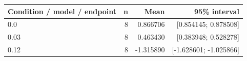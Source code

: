 \begin{longtable}{p{.56\linewidth}rrr}
\toprule Condition / model / endpoint & n & Mean & 95\% interval\\\midrule
0.0 & 8 & 0.866706 & [0.854145; 0.878508] \\
0.03 & 8 & 0.463430 & [0.383948; 0.528278] \\
0.12 & 8 & -1.315890 & [-1.628601; -1.025866] \\
\bottomrule\end{longtable}
